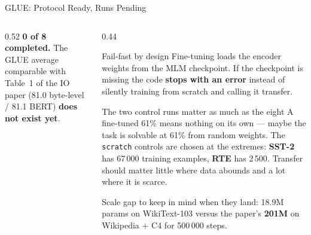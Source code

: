\documentclass[aspectratio=169,11pt]{beamer}
\begin{document}
\begin{frame}[shrink=5]{GLUE: Protocol Ready, Runs Pending}
\begin{columns}[T]
\begin{column}{0.52\textwidth}
      \scriptsize \textbf{0 of 8 completed.} The GLUE average comparable with Table~1 of the IO paper (81.0 byte-level / 81.1 BERT) \textbf{does not exist yet}.
    \end{column}
    \begin{column}{0.44\textwidth}
      \begin{block}{Fail-fast by design}
        \small
        Fine-tuning loads the encoder weights from the MLM checkpoint. If the checkpoint is missing the code \textbf{stops with an error} instead of silently training from scratch and calling it transfer.
      \end{block}

      \vspace{0.3em}
      \begin{block}{The two control runs matter as much as the eight}
        \small
        A fine-tuned 61\% means nothing on its own --- maybe the task is solvable at 61\% from random weights. The \texttt{scratch} controls are chosen at the extremes: \textbf{SST-2} has 67\,000 training examples, \textbf{RTE} has 2\,500. Transfer should matter little where data abounds and a lot where it is scarce.
      \end{block}

      \vspace{0.2em}
      \scriptsize Scale gap to keep in mind when they land: 18.9M params on WikiText-103 versus the paper's \textbf{201M} on Wikipedia $+$ C4 for 500\,000 steps.
    \end{column}
  \end{columns}
\end{frame}
\end{document}
